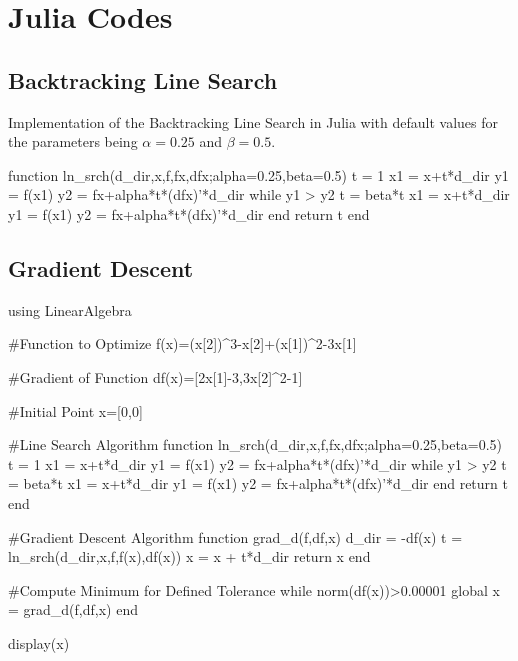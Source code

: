 
\chapter{Julia Codes}

\section{Backtracking Line Search}
Implementation of the Backtracking Line Search in Julia with default values for the parameters being $\alpha=0.25$ and $\beta=0.5$.
\begin{jllisting}
	function ln_srch(d_dir,x,f,fx,dfx;alpha=0.25,beta=0.5)
		t = 1
		x1 = x+t*d_dir
		y1 = f(x1)
		y2 = fx+alpha*t*(dfx)'*d_dir
		while y1 > y2
			t = beta*t
			x1 = x+t*d_dir
			y1 = f(x1)
			y2 = fx+alpha*t*(dfx)'*d_dir
		end
		return t
	end
\end{jllisting}

\section{Gradient Descent}\label{alg:grad-desc}
\begin{jllisting}
	using LinearAlgebra
	
	#Function to Optimize
	f(x)=(x[2])^3-x[2]+(x[1])^2-3x[1]
	
	#Gradient of Function
	df(x)=[2x[1]-3,3x[2]^2-1]
	
	#Initial Point
	x=[0,0]
	
	#Line Search Algorithm
	function ln_srch(d_dir,x,f,fx,dfx;alpha=0.25,beta=0.5)
		t = 1
		x1 = x+t*d_dir
		y1 = f(x1)
		y2 = fx+alpha*t*(dfx)'*d_dir
		while y1 > y2
			t = beta*t
			x1 = x+t*d_dir
			y1 = f(x1)
			y2 = fx+alpha*t*(dfx)'*d_dir
		end
		return t
	end
	
	#Gradient Descent Algorithm
	function grad_d(f,df,x)
		d_dir = -df(x)
		t = ln_srch(d_dir,x,f,f(x),df(x))
		x = x + t*d_dir
		return x
	end
	
	#Compute Minimum for Defined Tolerance
	while norm(df(x))>0.00001
		global x = grad_d(f,df,x)
	end
	
	display(x)

	
\end{jllisting}

